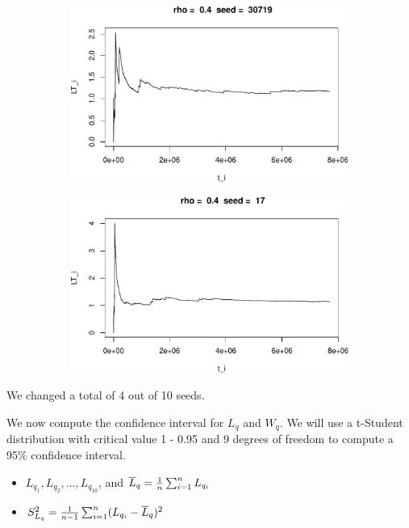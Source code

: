 \documentclass[]{article}
\providecommand{\tightlist}{%
  \setlength{\itemsep}{0pt}\setlength{\parskip}{0pt}}
\begin{document}
\begin{figure}[h!]
\begin{subfigure}[b]{.55\linewidth}
\includegraphics[width=\linewidth]{003_files/figure-latex/unnamed-chunk-14-9.pdf}
\end{subfigure}\hfill
\begin{subfigure}[b]{.55\linewidth}
\includegraphics[width=\linewidth]{003_files/figure-latex/unnamed-chunk-14-10.pdf}
\end{subfigure}\vfill
\end{figure}



We changed a total of 4 out of 10 seeds.

We now compute the confidence interval for \(L_{q}\) and \(W_{q}\). We
will use a t-Student distribution with critical value 1 - 0.95 and 9
degrees of freedom to compute a 95\% confidence interval.

\begin{itemize}
\tightlist
\item
  \(L_{q_{1}},L_{q_{2}},...,L_{q_{10}}\), and
  \(\overline{L}_{q} = {1 \over n}\sum_{i=1}^{n}L_{q_{i}}\)
\item
  \(S_{L_{q}}^{2} = {1 \over n - 1} \sum_{i=1}^{n} ( L_{q_{i}} - \overline{L}_{q} )^{2}\)
\end{itemize}
\end{document}
